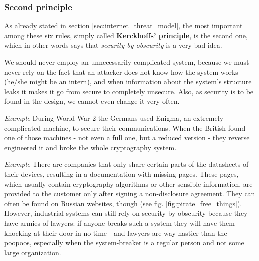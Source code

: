 \subsubsection*{Second principle}
As already stated in section \ref{sec:internet_threat_model}, the most important among these six rules, simply called \textbf{Kerckhoffs’ principle}, is the second one, which in other words says that \textit{security by obscurity} is a very bad idea.

We should never employ an unnecessarily complicated system, because we must never rely on the fact that an attacker does not know how the system works (he/she might be an intern), and when information about the system's structure leaks it makes it go from secure to completely unsecure. Also, as security is to be found in the design, we cannot even change it very often.

\vspace{0.5em}

\emph{Example} During World War 2 the Germans used Enigma, an extremely complicated machine, to secure their communications. When the British found one of those machines - not even a full one, but a reduced version - they reverse engineered it and broke the whole cryptography system.

\vspace{0.5em}

\emph{Example} There are companies that only share certain parts of the datasheets of their devices, resulting in a documentation with missing pages. These pages, which usually contain cryptography algorithms or other sensible information, are provided to the customer only after signing a non-disclosure agreement. They can often be found on Russian websites, though (see fig. \ref{fig:pirate_free_things}). However, industrial systems can still rely on security by obscurity because they have armies of lawyers: if anyone breaks such a system they will have them knocking at their door in no time - and lawyers are way nastier than the poopoos, especially when the system-breaker is a regular person and not some large organization.

